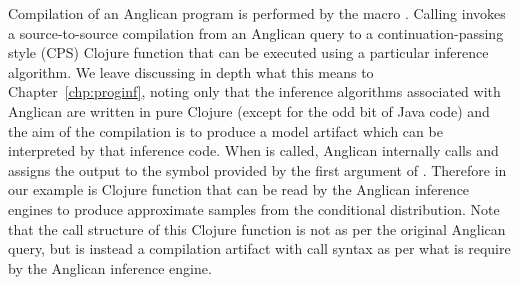 Compilation of an Anglican program is performed by the macro \query.  Calling \query
invokes a source-to-source compilation from an Anglican query to a continuation-passing 
style (CPS) Clojure function that can be executed using a particular inference algorithm.  We
leave discussing in depth what this means to Chapter~\ref{chp:proginf}, noting only that
the inference algorithms associated with Anglican are written in pure Clojure (except for the odd
bit of Java code) and the aim of the compilation is to produce a model artifact which can be
interpreted by that inference code.
When  is called, Anglican internally calls \query and assigns the output to
the symbol provided by the first argument of .  Therefore {\small {}} in
our example is Clojure function that can be read by the Anglican inference engines to produce
approximate samples from the conditional distribution.  Note that the call structure of this Clojure
function is not as per the original Anglican query, but is instead a compilation artifact with
call syntax as per what is require by the Anglican inference engine.

